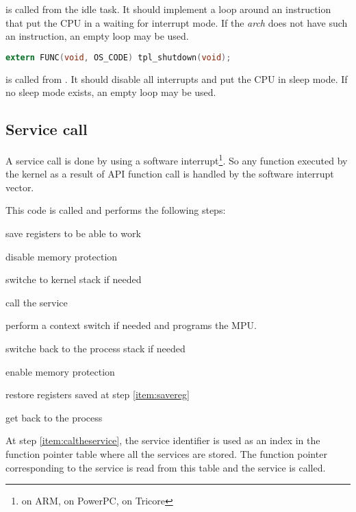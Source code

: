  is called from the idle task. It should implement a loop around an instruction that put the CPU in a waiting for interrupt mode. If the {\em arch} does not have such an instruction, an empty loop may be used.


\begin{lstlisting}[language=C]
extern FUNC(void, OS_CODE) tpl_shutdown(void);
\end{lstlisting}

 is called from . It should disable all interrupts and put the CPU in sleep mode. If no sleep mode exists, an empty loop may be used.


\subsection{Service call}

A service call is done by using a software interrupt\footnote{ on ARM,  on PowerPC,  on Tricore}. So any function executed by the kernel as a result of API function call is handled by the software interrupt vector.

This code is called  and performs the following steps:

\begin{penum}
\item save registers to be able to work \label{item:savereg}
\item disable memory protection
\item switche to kernel stack if needed
\item call the service \label{item:caltheservice}
\item perform a context switch if needed and programs the MPU.
\item switche back to the process stack if needed
\item enable memory protection
\item restore registers saved at step \ref{item:savereg}
\item get back to the process
\end{penum}

At step \ref{item:caltheservice}, the service identifier is used as an index in the function pointer table where all the services are stored. The function pointer corresponding to the service is read from this table and the service is called.

